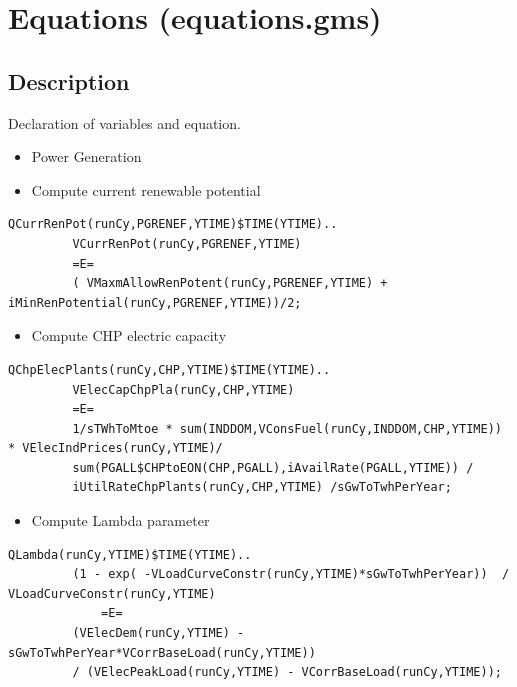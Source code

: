 \documentclass[a4paper,]{scrartcl}
\providecommand{\tightlist}{%
  \setlength{\itemsep}{0pt}\setlength{\parskip}{0pt}}
\begin{document}
\pagebreak

\section{Equations (equations.gms)}\label{id-equations.gms}

\subsection{Description}\label{description-1}

Declaration of variables and equation.

\begin{itemize}
\item
  Power Generation
\item
  Compute current renewable potential
\end{itemize}

\begin{lstlisting}
QCurrRenPot(runCy,PGRENEF,YTIME)$TIME(YTIME)..
         VCurrRenPot(runCy,PGRENEF,YTIME) 
         =E=
         ( VMaxmAllowRenPotent(runCy,PGRENEF,YTIME) + iMinRenPotential(runCy,PGRENEF,YTIME))/2;
\end{lstlisting}

\begin{itemize}
\tightlist
\item
  Compute CHP electric capacity
\end{itemize}

\begin{lstlisting}
QChpElecPlants(runCy,CHP,YTIME)$TIME(YTIME)..
         VElecCapChpPla(runCy,CHP,YTIME)
         =E=
         1/sTWhToMtoe * sum(INDDOM,VConsFuel(runCy,INDDOM,CHP,YTIME)) * VElecIndPrices(runCy,YTIME)/
         sum(PGALL$CHPtoEON(CHP,PGALL),iAvailRate(PGALL,YTIME)) /
         iUtilRateChpPlants(runCy,CHP,YTIME) /sGwToTwhPerYear;  
\end{lstlisting}

\begin{itemize}
\tightlist
\item
  Compute Lambda parameter
\end{itemize}

\begin{lstlisting}
QLambda(runCy,YTIME)$TIME(YTIME)..
         (1 - exp( -VLoadCurveConstr(runCy,YTIME)*sGwToTwhPerYear))  / VLoadCurveConstr(runCy,YTIME)
             =E=
         (VElecDem(runCy,YTIME) - sGwToTwhPerYear*VCorrBaseLoad(runCy,YTIME))
         / (VElecPeakLoad(runCy,YTIME) - VCorrBaseLoad(runCy,YTIME));
\end{lstlisting}
\end{document}
